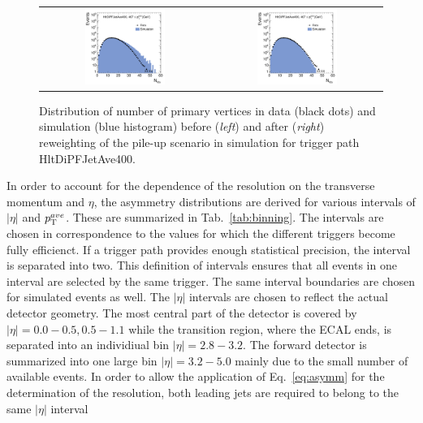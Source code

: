 \begin{figure}[!tp]
  \centering
  \begin{tabular}{cc}
                \includegraphics[width=0.49\textwidth]{figures/NVtx_HltDiPFJetAve400_AfterTriggerSelection.pdf} &
                \includegraphics[width=0.49\textwidth]{figures/NVtx_HltDiPFJetAve400_AfterPUReweighting.pdf}
  \end{tabular}
  \caption{Distribution of number of primary vertices in data (black dots) and simulation (blue histogram) before (\textit{left}) and after (\textit{right}) reweighting of the pile-up scenario in simulation for trigger path HltDiPFJetAve400.}
  \label{fig:pu_reweight}
\end{figure}
In order to account for the dependence of the resolution on the transverse momentum and $\eta$, the asymmetry distributions are derived for various intervals of $|\eta|$ and $p_{\text{T}}^{ave}$. These are summarized in Tab.~\ref{tab:binning}. The \ptave intervals are chosen in correspondence to the \ptave values for which the different triggers become fully efficienct. If a trigger path provides enough statistical precision, the interval is separated into two. This definition of \ptave intervals ensures that all events in one \ptave interval are selected by the same trigger. The same interval boundaries are chosen for simulated events as well. The $|\eta|$ intervals are chosen to reflect the actual detector geometry. The most central part of the detector is covered by $|\eta| = 0.0 - 0.5, 0.5 - 1.1$ while the transition region, where the ECAL ends, is separated into an individiual bin $|\eta| = 2.8 - 3.2$. The forward detector is summarized into one large bin $|\eta| = 3.2 - 5.0$ mainly due to the small number of available events. In order to allow the application of Eq.~\ref{eq:asymm} for the determination of the resolution, both leading jets are required to belong to the same $|\eta|$ interval
